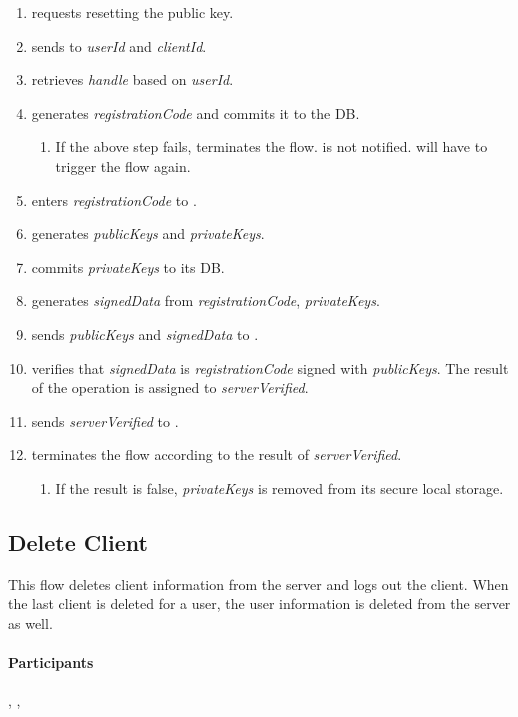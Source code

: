 \documentclass[a4paper,10pt,draft]{article}
\newcommand{\signedData}{\emph{signedData}}
\newcommand{\serverVerified}{\emph{serverVerified}}
\newcommand{\handle}{\emph{handle}}
\newcommand{\registrationCode}{\emph{registrationCode}}
\newcommand{\privateKeys}{\emph{privateKeys}}
\newcommand{\publicKeys}{\emph{publicKeys}}
\newcommand{\userId}{\emph{userId}}
\newcommand{\clientId}{\emph{clientId}}
\begin{document}
\begin{enumerate}
 \item \User{} requests resetting the public key.
 \item \Client{} sends to \Server{} \userId{} and \clientId{}.
 \item \Server{} retrieves \handle{} based on \userId.
 \item \Server{} generates \registrationCode{} and commits it to the DB.
 \begin{enumerate}
  \item If the above step fails, \Server{} terminates the flow. \Client{} is 
not notified. \User{} will have to trigger the flow again.
 \end{enumerate}
 \item \User{} enters \registrationCode{} to \Client{}.
 \item \Client{} generates \publicKeys{} and \privateKeys{}.
 \item \Client{} commits \privateKeys{} to its DB.
 \item \Client{} generates \signedData{} from \registrationCode{}, 
\privateKeys{}.
 \item \Client{} sends \publicKeys{} and \signedData{} to \Server{}.
 \item \Server{} verifies that \signedData{} is \registrationCode{} signed 
with \publicKeys{}. The result of the operation is assigned to \serverVerified{}.
 \item \Server{} sends \serverVerified{} to \Client{}.
 \item \Client{} terminates the flow according to the result of 
\serverVerified{}.
 \begin{enumerate}
  \item If the result is false, \privateKeys{} is removed from its secure local 
storage.
 \end{enumerate}
\end{enumerate}

\subsection{Delete Client}
This flow deletes client information from the server and logs out the client. 
When the last client is deleted for a user, the user information is deleted 
from the server as well.

\paragraph{Participants} \Client{}, \Server{}, \User{}
\end{document}
